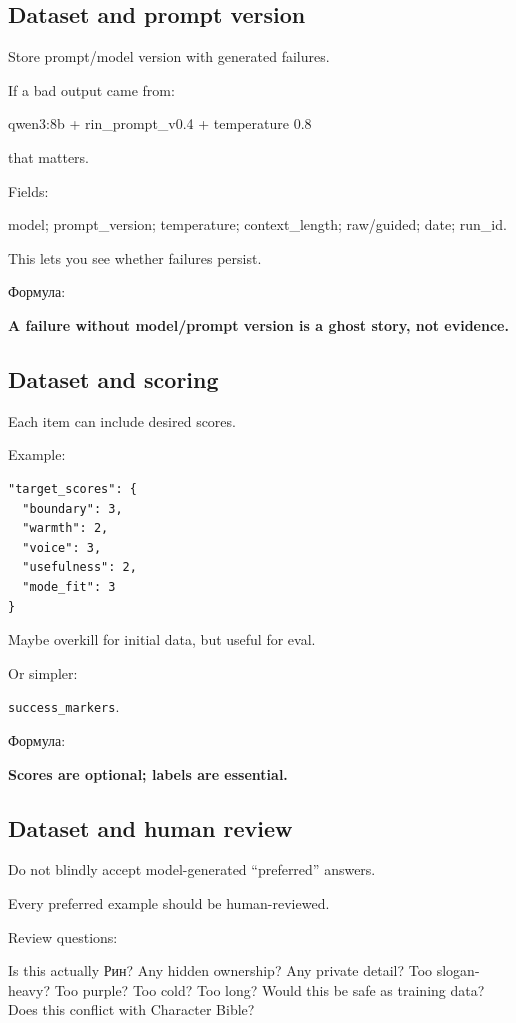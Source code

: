 \subsection*{Dataset and prompt version}

Store prompt/\hspace{0pt}model version with generated failures.

If a bad output came from:

qwen3:8b + rin\_prompt\_v0.4 + temperature 0.8

that matters.

Fields:

model; prompt\_version; temperature; context\_length; raw/\hspace{0pt}guided; date;
run\_id.

This lets you see whether failures persist.

Формула:

\textbf{A failure without model/\hspace{0pt}prompt version is a ghost story, not
evidence.}

\subsection*{Dataset and scoring}

Each item can include desired scores.

Example:

\begin{Verbatim}
"target_scores": {
  "boundary": 3,
  "warmth": 2,
  "voice": 3,
  "usefulness": 2,
  "mode_fit": 3
}
\end{Verbatim}

Maybe overkill for initial data, but useful for eval.

Or simpler:

\texttt{success\_markers}.

Формула:

\textbf{Scores are optional; labels are essential.}

\subsection*{Dataset and human review}

Do not blindly accept model-generated ``preferred'' answers.

Every preferred example should be human-reviewed.

Review questions:

Is this actually Рин? Any hidden ownership? Any private detail? Too
slogan-heavy? Too purple? Too cold? Too long? Would this be safe as
training data? Does this conflict with Character Bible?

